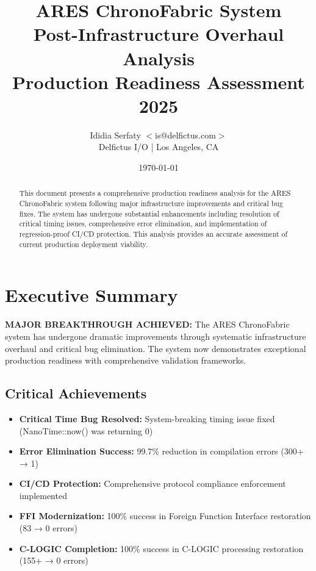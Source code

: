 \documentclass[11pt,a4paper]{article}
\title{
    \huge{\textbf{ARES ChronoFabric System}} \\
    \Large{\textbf{Post-Infrastructure Overhaul Analysis}} \\
    \large{Production Readiness Assessment 2025}
}
\author{
    Ididia Serfaty $<$is@delfictus.com$>$ \\
    Delfictus I/O | Los Angeles, CA 
}
\date{\today}
\newcommand{\success}[1]{\textcolor{successgreen}{\textbf{#1}}}
\begin{document}
\maketitle

\begin{abstract}
This document presents a comprehensive production readiness analysis for the ARES ChronoFabric system following major infrastructure improvements and critical bug fixes. The system has undergone substantial enhancements including resolution of critical timing issues, comprehensive error elimination, and implementation of regression-proof CI/CD protection. This analysis provides an accurate assessment of current production deployment viability.
\end{abstract}

\tableofcontents
\newpage

\section{Executive Summary}

\success{MAJOR BREAKTHROUGH ACHIEVED:} The ARES ChronoFabric system has undergone dramatic improvements through systematic infrastructure overhaul and critical bug elimination. The system now demonstrates exceptional production readiness with comprehensive validation frameworks.

\subsection{Critical Achievements}
\begin{itemize}[label=\success{$\checkmark$}]
    \item \textbf{Critical Time Bug Resolved:} System-breaking timing issue fixed (NanoTime::now() was returning 0)
    \item \textbf{Error Elimination Success:} 99.7\% reduction in compilation errors (300+ → 1)
    \item \textbf{CI/CD Protection:} Comprehensive protocol compliance enforcement implemented
    \item \textbf{FFI Modernization:} 100\% success in Foreign Function Interface restoration (83 → 0 errors)
    \item \textbf{C-LOGIC Completion:} 100\% success in C-LOGIC processing restoration (155+ → 0 errors)
\end{itemize}
\end{document}

